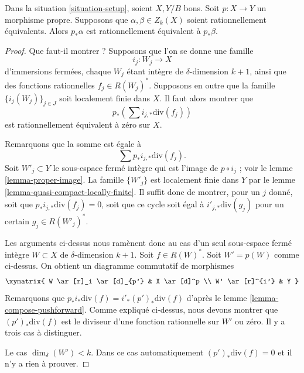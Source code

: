 \begin{lemma}
\label{lemma-proper-pushforward-rational-equivalence}
Dans la situation \ref{situation-setup}, soient $X, Y/B$ bons. Soit $p :
X \to Y$ un morphisme propre. Supposons que $\alpha, \beta \in Z_k(X)$ soient
rationnellement équivalents. Alors $p_*\alpha$ est rationnellement équivalent
à $p_*\beta$.
\end{lemma}

\begin{proof}
Que faut-il montrer ? Supposons que l'on se donne une famille
$$
i_j : W_j \longrightarrow X
$$
d'immersions fermées, chaque $W_j$ étant intègre de $\delta$-dimension $k +
1$, ainsi que des fonctions rationnelles $f_j \in R(W_j)^*$. Supposons en outre
que la famille $\{i_j(W_j)\}_{j \in J}$ soit localement finie dans $X$. Il faut
alors montrer que
$$
p_*\left(\sum i_{j, *}\text{div}(f_j)\right)
$$
est rationnellement équivalent à zéro sur $X$.

\medskip\noindent
Remarquons que la somme est égale à
$$
\sum p_*i_{j, *}\text{div}(f_j).
$$
Soit $W'_j \subset Y$ le sous-espace fermé intègre qui est l'image de $p
\circ i_j$ ; voir le lemme \ref{lemma-proper-image}. La famille $\{W'_j\}$ est
localement finie dans $Y$ par le lemme
\ref{lemma-quasi-compact-locally-finite}. Il suffit donc de montrer, pour un
$j$ donné, soit que $p_*i_{j, *}\text{div}(f_j) = 0$, soit que ce cycle soit égal à
$i'_{j, *}\text{div}(g_j)$ pour un certain $g_j \in R(W'_j)^*$.

\medskip\noindent
Les arguments ci-dessus nous ramènent donc au cas d'un seul sous-espace fermé
intègre $W \subset X$ de $\delta$-dimension $k + 1$. Soit $f \in
R(W)^*$. Soit $W' = p(W)$ comme ci-dessus. On obtient un diagramme commutatif
de morphismes
$$
\xymatrix{
W \ar[r]_i \ar[d]_{p'} & X \ar[d]^p \\
W' \ar[r]^{i'} & Y
}
$$
Remarquons que $p_*i_*\text{div}(f) = i'_*(p')_*\text{div}(f)$ d'après le lemme
\ref{lemma-compose-pushforward}. Comme expliqué ci-dessus, nous devons montrer
que $(p')_*\text{div}(f)$ est le diviseur d'une fonction rationnelle sur $W'$
ou zéro. Il y a trois cas à distinguer.

\medskip\noindent
Le cas $\dim_\delta(W') < k$. Dans ce cas automatiquement $(p')_*\text{div}(f)
= 0$ et il n'y a rien à prouver.


\end{proof}
